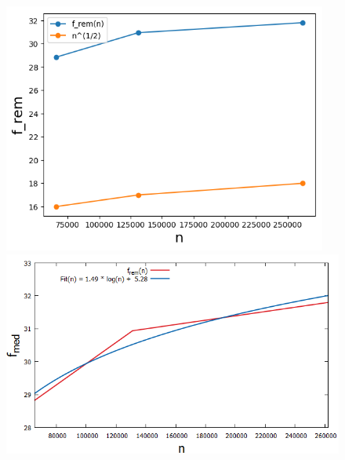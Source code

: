 \begin{figure}[H]
	\hspace*{-.9cm}
    \begin{minipage}[t]{.30\textwidth}
        \centering
		\includegraphics[width=0.95\textwidth]{pictures/med_algo_theo29_rem}
    \end{minipage}
    \hspace*{.3cm}
    \begin{minipage}[t]{.30\textwidth}
        \centering
        \includegraphics[width=1.25\textwidth]{pictures/med_algo_theo29_fit_rem}
    \end{minipage}
    \hspace*{1.2cm}
    \begin{minipage}[t]{.30\textwidth}
        \centering

\end{minipage}
\end{figure}
